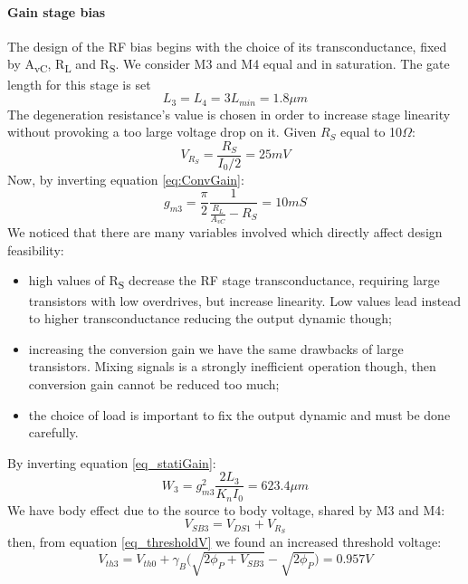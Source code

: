 \paragraph{Gain stage bias}
The design of the RF bias begins with the choice of its transconductance, fixed by A\textsubscript{vC}, R\textsubscript{L} and R\textsubscript{S}. We consider M3 and M4 equal and in saturation. The gate length for this stage is set
\begin{equation}
	L_3 = L_4 = 3 L_{min} = 1.8 \mu m
\end{equation} 
The  degeneration resistance's value is chosen in order to increase stage linearity without provoking a too large voltage drop on it. Given $R_S$ equal to 10$\Omega$:
\begin{equation}
V_{R_S}=\frac{R_S}{I_0/2} = 25 mV
\end{equation}
Now, by inverting equation \ref{eq:ConvGain}:
\begin{equation}
	g_{m3} = \frac{\pi}{2}\frac{1}{\frac{R_L}{A_{vC}}-R_S}=10 mS
\end{equation}
We noticed that there are many variables involved which directly affect design feasibility:
\begin{itemize}
	\item high values of R\textsubscript{S} decrease the RF stage transconductance, requiring large transistors with low overdrives, but increase linearity. Low values lead instead to higher transconductance reducing the output dynamic though;
	\item increasing the conversion gain we have the same drawbacks of large transistors. Mixing signals is a strongly inefficient operation though, then conversion gain cannot be reduced too much;
	\item the choice of load is important to fix the output dynamic and must be done carefully.
\end{itemize}
By inverting equation \ref{eq_statiGain}:
\begin{equation}
W_3 = g_{m3}^2\frac{2L_{3}}{K_nI_0} = 623.4 \mu m
\end{equation}
We have body effect due to the source to body voltage, shared by M3 and M4:
\begin{equation}
	V_{SB3} = V_{DS1}+V_{R_S}
\end{equation} 
then, from equation \ref{eq_thresholdV} we found an increased threshold voltage:
\begin{equation}
	V_{th3} = V_{th0}+\gamma_B\big(\sqrt{2\phi_P + V_{SB3}}-\sqrt{2\phi_P}\big) = 0.957 V 
\end{equation}
